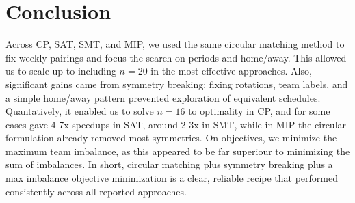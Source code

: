 \section{Conclusion}

Across CP, SAT, SMT, and MIP, we used the same circular matching method to fix weekly pairings and focus the search on periods and home/away.
This allowed us to scale up to including $n = 20$ in the most effective approaches.
Also, significant gains came from symmetry breaking: fixing rotations, team labels, and a simple home/away pattern prevented exploration of equivalent schedules.
Quantatively, it enabled us to solve $n=16$ to optimality in CP, and for some cases gave 4-7x speedups in SAT, around 2-3x in SMT, while in MIP the circular formulation already removed most symmetries.
On objectives, we minimize the maximum team imbalance, as this appeared to be far superiour to minimizing the sum of imbalances.
In short, circular matching plus symmetry breaking plus a max imbalance objective minimization is a clear, reliable recipe that performed consistently across all reported approaches. 


